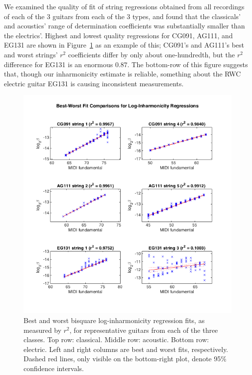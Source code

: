 \documentclass[12pt]{cmuthesis}
\begin{document}
We examined the quality of fit of string regressions obtained from all recordings of each of the 3 guitars from each of the 3 types, and found that the classicals' and acoustics' range of determination coefficients was substantially smaller than the electrics'. Highest and lowest quality regressions for CG091, AG111, and EG131 are shown in Figure~\ref{fig:best-worst-r2} as an example of this; CG091's and AG111's best and worst strings' $r^2$ coefficients differ by only about one-hundredth, but the $r^2$ difference for EG131 is an enormous $0.87$. The bottom-row of this figure suggests that, though our inharmonicity estimate is reliable, something about the RWC electric guitar EG131 is causing inconsistent measurements.

\begin{figure}[!htbp] 
\centering
\includegraphics[scale=0.75]{best-worst-r2}
\caption{Best and worst bisquare log-inharmonicity regression fits, as measured by $r^2$, for representative guitars from each of the three classes. Top row: classical. Middle row: acoustic. Bottom row: electric. Left and right columns are best and worst fits, respectively. Dashed red lines, only visible on the bottom-right plot, denote 95\% confidence intervals.}
\label{fig:best-worst-r2}
\end{figure}
\end{document}
